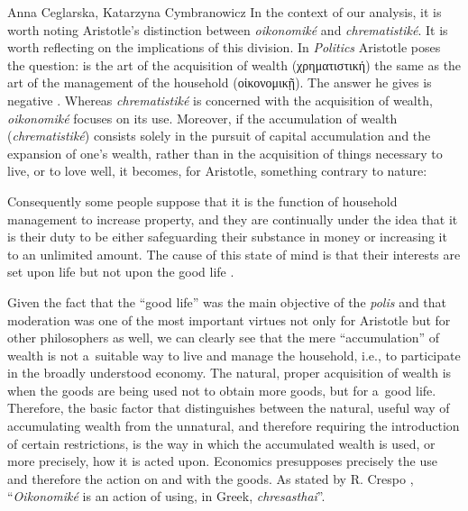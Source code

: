 \begin{artengenv2auth}{Anna Ceglarska, Katarzyna Cymbranowicz}
In the context of our analysis, it is worth noting Aristotle's distinction between \textit{oikonomiké} and \textit{chrematistiké}. It is worth reflecting on the implications of this division. In \textit{Politics} Aristotle poses the question: is the art of the acquisition of wealth
(\textgreek{χρηματιστική})
the same as the art of the management of the household
(\textgreek{οἰκονομικῇ}).
The answer he gives is negative 
\parencite[][1.1256a]{aristotle_politics_1944}. %
 Whereas \textit{chrematistiké} is concerned with the acquisition of wealth, \textit{oikonomiké} focuses on its use. Moreover, if the accumulation of wealth (\textit{chrematistiké}) consists solely in the pursuit of capital accumulation and the expansion of one's wealth, rather than in the acquisition of things necessary to live, or to love well, it becomes, for Aristotle, something contrary to nature:



Consequently some people suppose that it is the function of household management to increase property, and they are continually under the idea that it is their duty to be either safeguarding their substance in money or increasing it to an unlimited amount. The cause of this state of mind is that their interests are set upon life but not upon the good life 
\parencite[][1.1257b]{aristotle_politics_1944}.%




Given the fact that the ``good life'' was the main objective of the \textit{polis} and that moderation was one of the most important virtues not only for Aristotle but for other philosophers as well, we can clearly see that the mere ``accumulation'' of wealth is not a~suitable way to live and manage the household, i.e., to participate in the broadly understood economy. The natural, proper acquisition of wealth is when the goods are being used not to obtain more goods, but for a~good life. Therefore, the basic factor that distinguishes between the natural, useful way of accumulating wealth from the unnatural, and therefore requiring the introduction of certain restrictions, is the way in which the accumulated wealth is used, or more precisely, how it is acted upon. Economics presupposes precisely the use and therefore the action on and with the goods. As stated by R. Crespo 
\parencite*[][p.772]{crespo_ontology_2006}, %
 ``\textit{Oikonomiké} is an action of using, in Greek, \textit{chresasthai}''.




\end{artengenv2auth}
